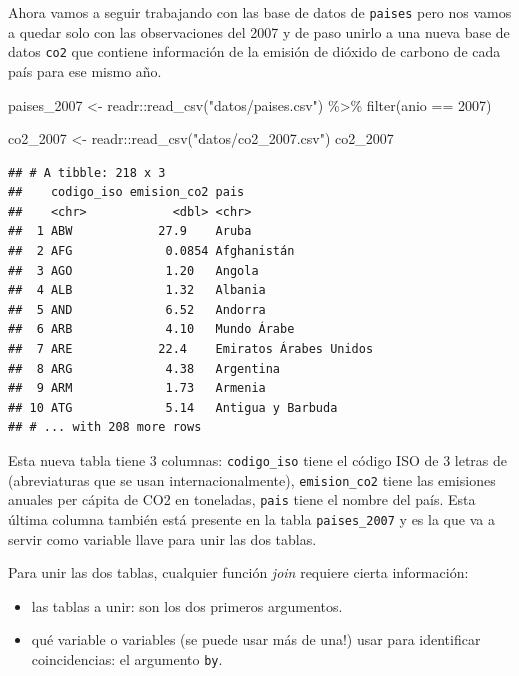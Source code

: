 \documentclass[
  openany]{book}
\newenvironment{Shaded}{\begin{snugshade}}{\end{snugshade}}
\newcommand{\DecValTok}[1]{\textcolor[rgb]{0.00,0.00,0.81}{#1}}
\newcommand{\FunctionTok}[1]{\textcolor[rgb]{0.00,0.00,0.00}{#1}}
\newcommand{\NormalTok}[1]{#1}
\newcommand{\OtherTok}[1]{\textcolor[rgb]{0.56,0.35,0.01}{#1}}
\newcommand{\SpecialCharTok}[1]{\textcolor[rgb]{0.00,0.00,0.00}{#1}}
\newcommand{\StringTok}[1]{\textcolor[rgb]{0.31,0.60,0.02}{#1}}
\providecommand{\tightlist}{%
  \setlength{\itemsep}{0pt}\setlength{\parskip}{0pt}}
\begin{document}
Ahora vamos a seguir trabajando con las base de datos de \texttt{paises} pero nos vamos a quedar solo con las observaciones del 2007 y de paso unirlo a una nueva base de datos \texttt{co2} que contiene información de la emisión de dióxido de carbono de cada país para ese mismo año.

\begin{Shaded}
\begin{Highlighting}[]
\NormalTok{paises\_2007 }\OtherTok{\textless{}{-}}\NormalTok{ readr}\SpecialCharTok{::}\FunctionTok{read\_csv}\NormalTok{(}\StringTok{"datos/paises.csv"}\NormalTok{) }\SpecialCharTok{\%\textgreater{}\%} 
  \FunctionTok{filter}\NormalTok{(anio }\SpecialCharTok{==} \DecValTok{2007}\NormalTok{) }

\NormalTok{co2\_2007 }\OtherTok{\textless{}{-}}\NormalTok{ readr}\SpecialCharTok{::}\FunctionTok{read\_csv}\NormalTok{(}\StringTok{"datos/co2\_2007.csv"}\NormalTok{)}
\NormalTok{co2\_2007}
\end{Highlighting}
\end{Shaded}

\begin{verbatim}
## # A tibble: 218 x 3
##    codigo_iso emision_co2 pais                  
##    <chr>            <dbl> <chr>                 
##  1 ABW            27.9    Aruba                 
##  2 AFG             0.0854 Afghanistán           
##  3 AGO             1.20   Angola                
##  4 ALB             1.32   Albania               
##  5 AND             6.52   Andorra               
##  6 ARB             4.10   Mundo Árabe           
##  7 ARE            22.4    Emiratos Árabes Unidos
##  8 ARG             4.38   Argentina             
##  9 ARM             1.73   Armenia               
## 10 ATG             5.14   Antigua y Barbuda     
## # ... with 208 more rows
\end{verbatim}

Esta nueva tabla tiene 3 columnas: \texttt{codigo\_iso} tiene el código ISO de 3 letras de (abreviaturas que se usan internacionalmente), \texttt{emision\_co2} tiene las emisiones anuales per cápita de CO2 en toneladas, \texttt{pais} tiene el nombre del país.
Esta última columna también está presente en la tabla \texttt{paises\_2007} y es la que va a servir como variable llave para unir las dos tablas.

Para unir las dos tablas, cualquier función \emph{join} requiere cierta información:

\begin{itemize}
\tightlist
\item
  las tablas a unir: son los dos primeros argumentos.
\item
  qué variable o variables (se puede usar más de una!) usar para identificar coincidencias: el argumento \texttt{by}.
\end{itemize}
\end{document}
